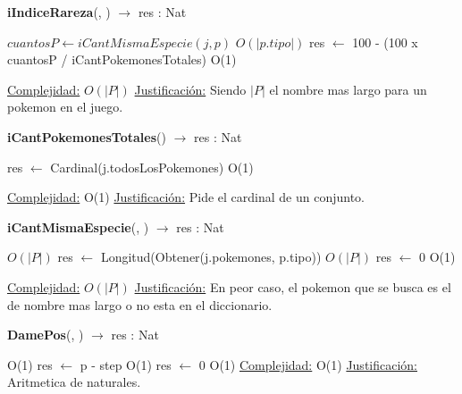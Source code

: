 \begin{algorithm}[H]{\textbf{iIndiceRareza}(, )  $\to$ res : Nat} 
	{}
	\begin{algorithmic}
		\State $cuantosP \gets iCantMismaEspecie(j, p) $ \Comment $O(|p.tipo|)$
		\State res $\gets$ 100 - (100 x cuantosP / iCantPokemonesTotales)  \Comment O(1)
	
		\medskip
		\Statex \underline{Complejidad:} $O(|P|)$
		\Statex \underline{Justificación:} Siendo $|P|$ el nombre mas largo para un pokemon en el juego.
    \end{algorithmic}
\end{algorithm}

\begin{algorithm}[H]{\textbf{iCantPokemonesTotales}() $\to$ res : Nat} 
	{}
	\begin{algorithmic}
		\State res $\gets$ Cardinal(j.todosLosPokemones)	\Comment O(1)
	
		\medskip
		\Statex \underline{Complejidad:} O(1)
		\Statex \underline{Justificación:} Pide el cardinal de un conjunto.
    \end{algorithmic}
\end{algorithm}

\begin{algorithm}[H]{\textbf{iCantMismaEspecie}(, ) $\to$ res : Nat} 
	{}
	\begin{algorithmic}
		 \Comment $O(|P|)$
			\State res $\gets$ Longitud(Obtener(j.pokemones, p.tipo)) \Comment $O(|P|)$
		\Else
			\State res $\gets$ 0  \Comment O(1)
		\EndIf
	
		\medskip
		\Statex \underline{Complejidad:} $O(|P|)$
		\Statex \underline{Justificación:} En peor caso, el pokemon que se busca es el de nombre mas largo o no esta en el diccionario.
    \end{algorithmic}
\end{algorithm}

\begin{algorithm}[H]{\textbf{DamePos}(, ) $\to$ res : Nat} 
	{}
	\begin{algorithmic}
     \Comment O(1)
      \State res $\gets$ p - step \Comment O(1)
    \Else
      \State res $\gets$ 0 \Comment O(1)
    \EndIf
		\medskip
		\Statex \underline{Complejidad:} O(1)
		\Statex \underline{Justificación:} Aritmetica de naturales.
    \end{algorithmic}
\end{algorithm}
